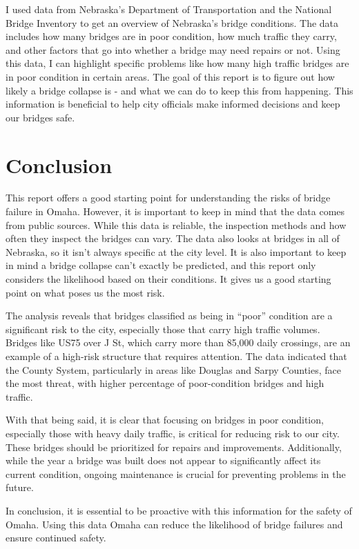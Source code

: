 \documentclass[
  letterpaper,
  DIV=11,
  numbers=noendperiod]{scrreprt}
\begin{document}
I used data from Nebraska's Department of Transportation and the
National Bridge Inventory to get an overview of Nebraska's bridge
conditions. The data includes how many bridges are in poor condition,
how much traffic they carry, and other factors that go into whether a
bridge may need repairs or not. Using this data, I can highlight
specific problems like how many high traffic bridges are in poor
condition in certain areas. The goal of this report is to figure out how
likely a bridge collapse is - and what we can do to keep this from
happening. This information is beneficial to help city officials make
informed decisions and keep our bridges safe.

\section{Conclusion}\label{conclusion-2}

This report offers a good starting point for understanding the risks of
bridge failure in Omaha. However, it is important to keep in mind that
the data comes from public sources. While this data is reliable, the
inspection methods and how often they inspect the bridges can vary. The
data also looks at bridges in all of Nebraska, so it isn't always
specific at the city level. It is also important to keep in mind a
bridge collapse can't exactly be predicted, and this report only
considers the likelihood based on their conditions. It gives us a good
starting point on what poses us the most risk.

The analysis reveals that bridges classified as being in ``poor''
condition are a significant risk to the city, especially those that
carry high traffic volumes. Bridges like US75 over J St, which carry
more than 85,000 daily crossings, are an example of a high-risk
structure that requires attention. The data indicated that the County
System, particularly in areas like Douglas and Sarpy Counties, face the
most threat, with higher percentage of poor-condition bridges and high
traffic.

With that being said, it is clear that focusing on bridges in poor
condition, especially those with heavy daily traffic, is critical for
reducing risk to our city. These bridges should be prioritized for
repairs and improvements. Additionally, while the year a bridge was
built does not appear to significantly affect its current condition,
ongoing maintenance is crucial for preventing problems in the future.

In conclusion, it is essential to be proactive with this information for
the safety of Omaha. Using this data Omaha can reduce the likelihood of
bridge failures and ensure continued safety.
\end{document}
